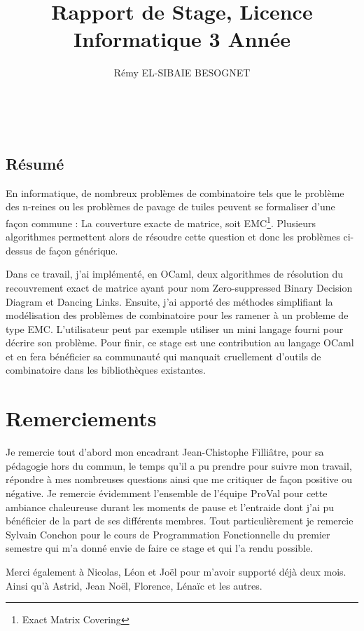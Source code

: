 \documentclass[a4paper]{article}
\title{Rapport de Stage, Licence Informatique 3\up{ème} Année}
\author{Rémy \textsc{EL-SIBAIE BESOGNET}}
\begin{document}


~
\vfill

\begin{center}
\section*{Résumé}
\end{center}
En informatique, de nombreux problèmes de combinatoire tels que le problème des 
n-reines ou les problèmes de pavage de tuiles peuvent se formaliser d'une
façon commune :
La couverture exacte de matrice, soit EMC\footnote{Exact Matrix Covering}. 
Plusieurs algorithmes permettent alors 
de résoudre cette question et donc les problèmes ci-dessus de façon générique.

Dans ce travail, j'ai implémenté, en OCaml, deux algorithmes de
résolution du recouvrement exact de matrice ayant pour nom 
Zero-suppressed Binary Decision
Diagram et Dancing Links. 
Ensuite, j'ai apporté des méthodes 
simplifiant la modélisation des problèmes de combinatoire pour les ramener
à un probleme de type EMC. L'utilisateur peut par 
exemple utiliser un mini langage fourni pour décrire son problème. Pour finir, 
ce stage est une contribution au langage OCaml et 
en fera bénéficier sa communauté qui manquait cruellement d'outils de 
combinatoire dans les bibliothèques existantes.

\vfill




\newpage
\section*{Remerciements}

Je remercie tout d'abord mon encadrant Jean-Chistophe Filliâtre, pour sa 
pédagogie hors du commun, le temps qu'il a pu prendre pour suivre mon 
travail, répondre à mes nombreuses questions ainsi que me critiquer de façon 
positive ou négative.
Je remercie évidemment l'ensemble de l'équipe ProVal pour cette ambiance 
chaleureuse durant les moments de pause et l'entraide dont j'ai pu 
bénéficier de la part de ses différents membres. Tout particulièrement je 
remercie Sylvain Conchon pour le cours de Programmation Fonctionnelle du
premier semestre qui m'a donné envie de faire ce stage et qui l'a rendu 
possible.

Merci également à Nicolas, Léon et Joël pour m'avoir supporté déjà deux mois. 
Ainsi qu'à Astrid, Jean Noël, Florence, Lénaïc et les autres.
\end{document}
